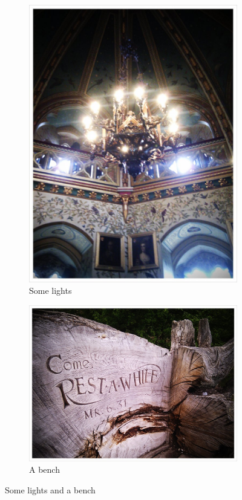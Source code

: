 \documentclass[12pt,twoside,a4paper]{article}
\begin{document}
	\begin{figure}[htb]
	    \centering
	    \begin{subfigure}[b]{0.3\textwidth}
	        \includegraphics[width=\textwidth]{img/lights}
	        \caption{Some lights}
	    \end{subfigure}
	    \begin{subfigure}[b]{0.3\textwidth}
	        \includegraphics[width=\textwidth]{img/bench}
	        \caption{A bench}
	    \end{subfigure}
	    \caption{Some lights and a bench}
	\end{figure}
\end{document}
